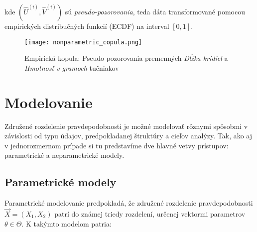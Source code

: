 kde $\left(\hat{U}^{(i)}, \hat{V}^{(i)}\right)$ sú \textit{pseudo-pozorovania}, teda dáta transformované pomocou empirických distribučných funkcií (ECDF) na interval $[0,1]$.

\begin{figure}[H]
    \centering
    \texttt{[image: nonparametric\_copula.png]}
    \caption{Empirická kopula: Pseudo-pozorovania premenných \textit{Dĺžka krídiel} a \textit{Hmotnosť v gramoch} tučniakov}
    \label{fig:nonparametric_copula}
\end{figure}

\section{Modelovanie}\label{sec:modelovanie}

Združené rozdelenie pravdepodobnosti je možné modelovať rôznymi spôsobmi v závislosti od typu údajov, predpokladanej štruktúry a cieľov analýzy. Tak, ako aj v jednorozmernom prípade si tu predstavíme dve hlavné vetvy prístupov: parametrické a neparametrické modely.

\subsection{Parametrické modely}\label{subsec:joint_param_models}

Parametrické modelovanie predpokladá, že združené rozdelenie pravdepodobnosti $\vec{X} = (X_1, X_2)$ patrí do známej triedy rozdelení, určenej vektormi parametrov $\theta \in \Theta$. K takýmto modelom patria:

